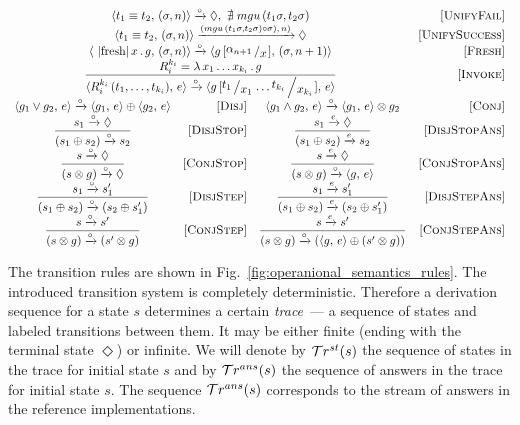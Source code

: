 \begin{figure*}[h]
  \renewcommand{\arraystretch}{1.6}
  \[
  \begin{array}{crcr}
    \multicolumn{3}{c}{\taskst{t_1 \equiv t_2}{(\sigma, n)} \xrightarrow{\circ} \Diamond , \, \, \nexists\; mgu\,(t_1 \sigma, t_2 \sigma)} &\ruleno{UnifyFail} \\
    \multicolumn{3}{c}{\taskst{t_1 \equiv t_2}{(\sigma, n)} \xrightarrow{(mgu\,(t_1 \sigma, t_2 \sigma) \circ \sigma),\, n)} \Diamond} & \ruleno{UnifySuccess} \\
    \multicolumn{3}{c}{\taskst{\mbox{\lstinline|fresh|}\, x\, .\, g}{(\sigma, n)} \xrightarrow{\circ} \taskst{g\,[\bigslant{\alpha_{n + 1}}{x}]}{( \sigma, n + 1)}} & \ruleno{Fresh} \\
    \multicolumn{3}{c}{\dfrac{R_i^{k_i}=\lambda\,x_1\dots x_{k_i}\,.\,g}{\taskst{R_i^{k_i}\,(t_1,\dots,t_{k_i})}{e} \xrightarrow{\circ} \taskst{g\,[\bigslant{t_1}{x_1}\dots\bigslant{t_{k_i}}{x_{k_i}}]}{e}}} & \ruleno{Invoke}\\[3mm]
    \taskst{g_1 \lor g_2}{e} \xrightarrow{\circ} \taskst{g_1}{e} \oplus \taskst{g_2}{e} & \ruleno{Disj} &
    \taskst{g_1 \land g_2}{e} \xrightarrow{\circ} \taskst{g_1}{e} \otimes g_2 & \ruleno{Conj} \\    
    \dfrac{s_1 \xrightarrow{\circ} \Diamond}{(s_1 \oplus s_2) \xrightarrow{\circ} s_2} & \ruleno{DisjStop} &
    \dfrac{s_1 \xrightarrow{e} \Diamond}{(s_1 \oplus s_2) \xrightarrow{e} s_2} & \ruleno{DisjStopAns}\\
    \dfrac{s \xrightarrow{\circ} \Diamond}{(s \otimes g) \xrightarrow{\circ} \Diamond} &\ruleno{ConjStop} &
    \dfrac{s \xrightarrow{e} \Diamond}{(s \otimes g) \xrightarrow{\circ} \taskst{g}{e}}  & \ruleno{ConjStopAns}\\
    \dfrac{s_1 \xrightarrow{\circ} s'_1}{(s_1 \oplus s_2) \xrightarrow{\circ} (s_2 \oplus s'_1)} &\ruleno{DisjStep} &
    \dfrac{s_1 \xrightarrow{e} s'_1}{(s_1 \oplus s_2) \xrightarrow{e} (s_2 \oplus s'_1)} &\ruleno{DisjStepAns}\\
    \dfrac{s \xrightarrow{\circ} s'}{(s \otimes g) \xrightarrow{\circ} (s' \otimes g)} &\ruleno{ConjStep} &
    \dfrac{s \xrightarrow{e} s'}{(s \otimes g) \xrightarrow{\circ} (\taskst{g}{e} \oplus (s' \otimes g))} & \ruleno{ConjStepAns} 
  \end{array}
  \]
  \caption{Operational semantics of interleaving search}
  \label{fig:operanional_semantics_rules}
\end{figure*}

The transition rules are shown in Fig.~\ref{fig:operanional_semantics_rules}.
The introduced transition system is completely deterministic.
Therefore a derivation sequence for a state $s$ determines a certain \emph{trace}~--- a sequence of states and labeled transitions between
them.
It may be either finite (ending with the terminal state $\Diamond$) or infinite.
We will denote by $\mathcal{T}r^{st}(s)$ the sequence of states in the trace for initial state $s$ and by $\mathcal{T}r^{ans}(s)$ the sequence of answers
in the trace for initial state $s$. The sequence $\mathcal{T}r^{ans}(s)$ corresponds to the stream of answers in the reference \mK implementations.

